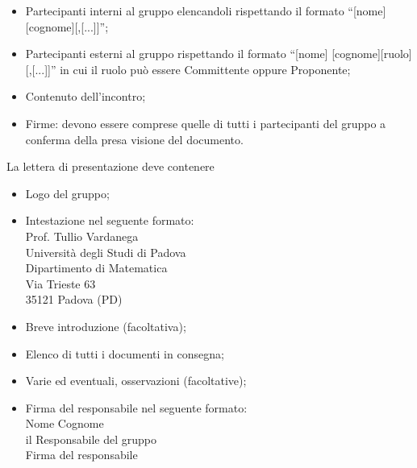 {{{\begin{itemize}
			\item Partecipanti interni al gruppo elencandoli rispettando il formato “[nome] [cognome][,[...]]”;
			\item Partecipanti esterni al gruppo rispettando il formato “[nome] [cognome][ruolo][,[...]]” in cui il ruolo può essere Committente oppure Proponente;
			\item Contenuto dell'incontro;
			\item Firme: devono essere comprese quelle di tutti i partecipanti del gruppo \gruppo a conferma della presa visione del documento.
		\end{itemize}
	  La lettera di presentazione deve contenere
		\begin{itemize}
			\item Logo del gruppo;
			\item Intestazione nel seguente formato:\\
					Prof. Tullio Vardanega\\
					Università degli Studi di Padova\\
					Dipartimento di Matematica\\
					Via Trieste 63\\
					35121 Padova (PD)
			\item Breve introduzione (facoltativa);
			\item Elenco di tutti i documenti in consegna;
			\item Varie ed eventuali, osservazioni (facoltative);
			\item Firma del responsabile nel seguente formato:\\
					{Nome} {Cognome}\\
					il Responsabile del gruppo \gruppo \\
					{Firma del responsabile}
		\end{itemize}		
	}
}}
